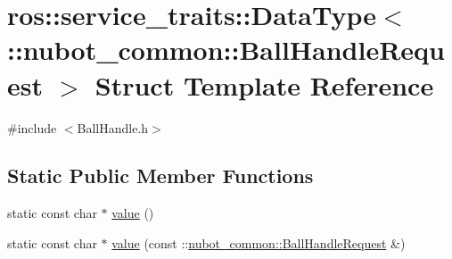 \hypertarget{structros_1_1service__traits_1_1DataType_3_01_1_1nubot__common_1_1BallHandleRequest_01_4}{\section{ros\-:\-:service\-\_\-traits\-:\-:Data\-Type$<$ \-:\-:nubot\-\_\-common\-:\-:Ball\-Handle\-Request $>$ Struct Template Reference}
\label{structros_1_1service__traits_1_1DataType_3_01_1_1nubot__common_1_1BallHandleRequest_01_4}
}


{\ttfamily \#include $<$Ball\-Handle.\-h$>$}

\subsection*{Static Public Member Functions}
\begin{DoxyCompactItemize}
\item 
static const char $\ast$ \hyperlink{structros_1_1service__traits_1_1DataType_3_01_1_1nubot__common_1_1BallHandleRequest_01_4_af3b155b8cb71f4affa8cc6fae62e311d}{value} ()
\item 
static const char $\ast$ \hyperlink{structros_1_1service__traits_1_1DataType_3_01_1_1nubot__common_1_1BallHandleRequest_01_4_a91a805430c8d32de16ac9d52cb2b4955}{value} (const \-::\hyperlink{namespacenubot__common_a100386a9c64318b13fb31e4548774326}{nubot\-\_\-common\-::\-Ball\-Handle\-Request} \&)
\end{DoxyCompactItemize}


